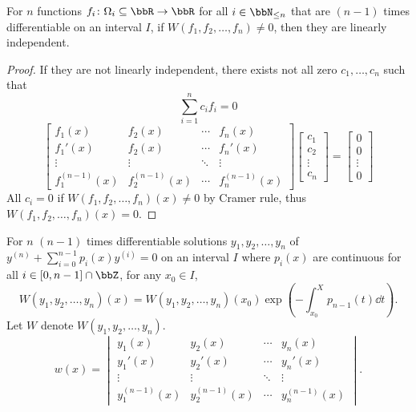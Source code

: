 \documentclass[a4paper,12pt]{report}
\begin{document}
For $n$ functions $f_i\colon\Omega_i\subseteq\bbR\to\bbR$ for all $i\in\bbN_{\le n}$ that are $(n-1)$ times differentiable on an interval $I$, if $W(f_1,f_2,\ldots,f_n)\ne0$, then they are linearly independent.
\begin{proof}
If they are not linearly independent, there exists not all zero $c_1,\ldots,c_n$ such that
\[\sum_{i=1}^nc_if_i=0\]
\[\begin{bmatrix}
f_1(x) & f_2(x) & \cdots & f_n(x) \\
f_1'(x) & f_2(x) & \cdots & f_n'(x) \\
\vdots & \vdots & \ddots & \vdots \\
f_1^{(n-1)}(x) & f_2^{(n-1)}(x) & \cdots & f_n^{(n-1)}(x)
\end{bmatrix}\begin{bmatrix}c_1\\c_2\\\vdots\\c_n\end{bmatrix}=\begin{bmatrix}0\\0\\\vdots\\0\end{bmatrix}\]
All $c_i=0$ if $W(f_1,f_2,\ldots,f_n)(x)\ne 0$ by Cramer rule, thus $W(f_1,f_2,\ldots,f_n)(x)=0$.
\end{proof}
For $n$ $(n-1)$ times differentiable solutions $y_1,y_2,\ldots,y_n$ of $y^{(n)}+\sum_{i=0}^{n-1}p_i(x)y^{(i)}=0$ on an interval $I$ where $p_i(x)$ are continuous for all $i\in[0,n-1]\cap\bbZ$, for any $x_0\in I$,
\[W(y_1,y_2,\ldots,y_n)(x)=W(y_1,y_2,\ldots,y_n)(x_0)\exp(-\int_{x_0}^Xp_{n-1}(t)\dd{t}).\]
\bpr
Let $W$ denote $W(y_1,y_2,\ldots,y_n)$.
\[w(x)=\begin{vmatrix}
y_1(x) & y_2(x) & \cdots & y_n(x) \\
y_1'(x) & y_2'(x) & \cdots & y_n'(x) \\
\vdots & \vdots & \ddots & \vdots \\
y_1^{(n-1)}(x) & y_2^{(n-1)}(x) & \cdots & y_n^{(n-1)}(x)
\end{vmatrix}.\]
\end{document}
